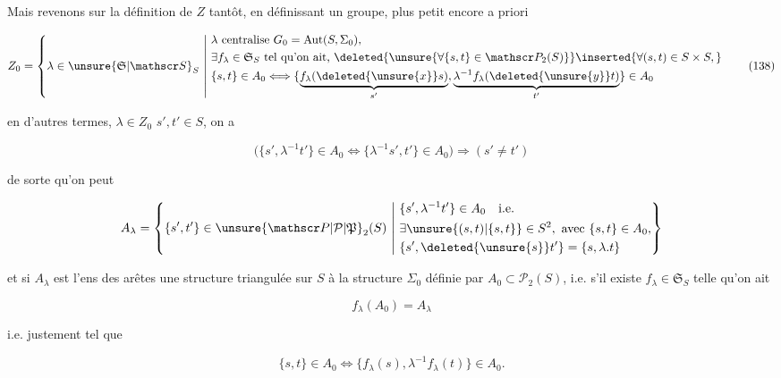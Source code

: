 

Mais revenons sur la définition de $Z$ tantôt, en définissant un  groupe, plus petit encore a priori

\[
 Z_0=\left\{\lambda\in\unsure{\mathfrak S|\mathscr S}_S\ \middle|\
 \begin{aligned}
 &\lambda\text{ centralise }G_0=\operatorname{Aut}(S,\Sigma_0),\\
 &\exists f_\lambda\in\mathfrak S_S\text{ tel qu'on ait, }
 \deleted{\unsure{\forall\{s,t\}\in\mathscr P_2(S)}}\inserted{\forall(s,t)\in S\times S,}\\
 &\{s,t\}\in A_0\Longleftrightarrow
 \{\underbrace{f_\lambda(\deleted{\unsure{x}}s)}_{s'},\underbrace{\lambda^{-1}f_\lambda(\deleted{\unsure{y}}t)}_{t'}\}\in A_0
 \end{aligned}\right.
 \tag*{(138)}
\]

en d'autres termes, $\lambda\in Z_0$    $s',t'\in S$,  on a

\[
 \bigl(\{s',\lambda^{-1}t'\}\in A_0\Longleftrightarrow
 \{\lambda^{-1}s',t'\}\in A_0\bigr)\Longrightarrow(s'\ne t')
 \tag*{(139)}
\]

de sorte qu'on peut  

\[
 A_\lambda=\left\{\{s',t'\}\in\unsure{\mathscr P|\mathcal P|\mathfrak P}_2(S)\ \middle|\
 \begin{aligned}
 &\{s',\lambda^{-1}t'\}\in A_0\quad\text{i.e.}\\
 &\exists\unsure{(s,t)|\{s,t\}}\in S^2,\ \text{avec }\{s,t\}\in A_0,\\
 &\{s',\deleted{\unsure{s}}t'\}=\{s,\lambda.t\}
 \end{aligned}\right\}
\]

et si $A_\lambda$ est l'ens des arêtes  une structure triangulée sur $S$   à la structure $\Sigma_0$ définie par $A_0\subset\mathscr P_2(S)$, i.e. s'il existe $f_\lambda\in\mathfrak S_S$ telle qu'on ait

\[
 f_\lambda(A_0)=A_\lambda
 \tag*{(140)}
\]

i.e. justement tel que

\[
 \{s,t\}\in A_0\Longleftrightarrow\{f_\lambda(s),\lambda^{-1}f_\lambda(t)\}\in A_0.
 \tag*{(141)}
\]

